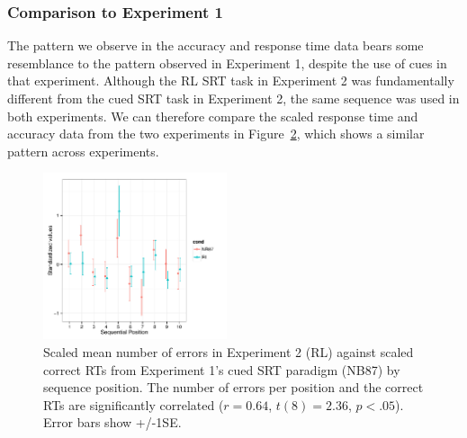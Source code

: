 \documentclass[man,floatsintext]{apa6}
\begin{document}
\begin{figure}[t]
\begin{subfigure}[t]{0.41\textwidth}
        \end{subfigure}
        \label{fig:RT-ACC-seqpos}
\end{figure}

\addtocounter{figure}{-1}



 
\subsubsection{Comparison to Experiment 1}

The pattern we observe in the accuracy and response time data bears some resemblance to the pattern observed in Experiment 1, despite the use of cues in that experiment. Although the RL SRT task in Experiment 2 was fundamentally different from the cued SRT task in Experiment 2, the same sequence was used in both experiments. We can therefore compare the scaled response time and accuracy data from the two experiments in Figure~\ref{fig:RLvsNB}, which shows a similar pattern across experiments.

\begin{figure}[!h]
  \centering
  \includegraphics[width=0.48\textwidth]{figures/RLvsNB_RTvsMis_seqpos}
  \caption{Scaled mean number of errors in Experiment 2 (RL) against scaled correct RTs from Experiment 1's cued SRT paradigm (NB87) by sequence position. The number of errors per position and the correct RTs are significantly correlated ($r=0.64$, $t(8)=2.36$, $p<.05$). Error bars show +/-1SE.}
  \label{fig:RLvsNB}
\end{figure}
\end{document}

